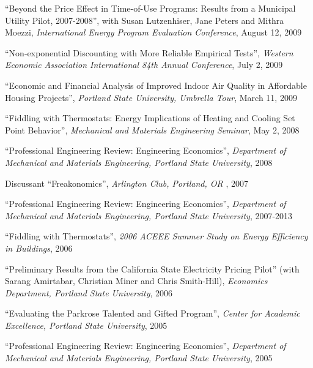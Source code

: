 \documentclass[Computer Science]{vita}
\begin{document}
\begin{vita}
\begin{Presentations and Invited Talks}
  \item ``Beyond the Price Effect in Time-of-Use Programs: Results
    from a Municipal Utility Pilot, 2007-2008'', with Susan
    Lutzenhiser, Jane Peters and Mithra Moezzi, \emph{International
      Energy Program Evaluation Conference}, August 12, 2009

  \item ``Non-exponential Discounting with More Reliable Empirical
    Tests'', \emph{Western Economic Association International 84th
      Annual Conference}, July 2, 2009

  \item ``Economic and Financial Analysis of Improved Indoor Air
    Quality in Affordable Housing Projects'', \emph{Portland State
      University, Umbrella Tour}, March 11, 2009

  \item ``Fiddling with Thermostats: Energy Implications of Heating
    and Cooling Set Point Behavior'', \emph{Mechanical and Materials
      Engineering Seminar}, May 2, 2008

  \item ``Professional Engineering Review: Engineering Economics'',
    \emph{Department of Mechanical and Materials Engineering, Portland
      State University}, 2008
  
  \item Discussant ``Freakonomics'', \emph{Arlington Club, Portland,
      OR }, 2007

  \item ``Professional Engineering Review: Engineering Economics'',
    \emph{Department of Mechanical and Materials Engineering, Portland
      State University}, 2007-2013

  \item ``Fiddling with Thermostats'', \emph{2006 ACEEE Summer Study
      on Energy Efficiency in Buildings}, 2006

  \item ``Preliminary Results from the California State Electricity
    Pricing Pilot'' (with Sarang Amirtabar, Christian Miner and Chris
    Smith-Hill), \emph{Economics Department, Portland State
      University}, 2006

  \item ``Evaluating the Parkrose Talented and Gifted Program'',
    \emph{Center for Academic Excellence, Portland State University},
    2005

  \item ``Professional Engineering Review: Engineering Economics'',
    \emph{Department of Mechanical and Materials Engineering, Portland
      State University}, 2005
	

\end{Presentations and Invited Talks}
\end{vita}
\end{document}
